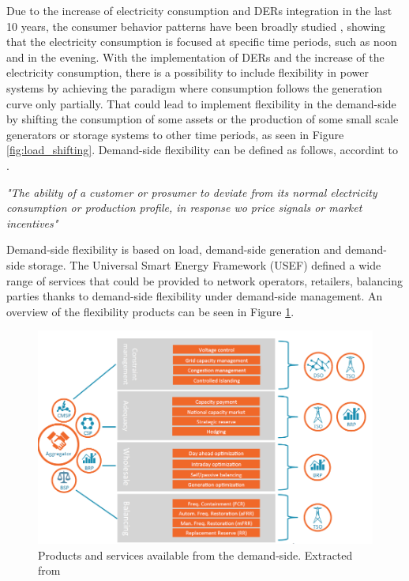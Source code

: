 Due to the increase of electricity consumption and DERs integration in the last 10 years, the consumer behavior patterns have been broadly studied \cite{ZHOU201773,TORRITI2014265}, showing that the electricity consumption is focused at specific time periods, such as noon and in the evening. With the implementation of DERs and the increase of the electricity consumption, there is a possibility to include flexibility in power systems by achieving the paradigm where consumption follows the generation curve only partially. That could lead to implement flexibility in the demand-side by shifting the consumption of some assets or the production of some small scale generators or storage systems to other time periods, as seen in Figure \ref{fig:load_shifting}. Demand-side flexibility can be defined as follows, accordint to \cite{EuropeanSmartGridsTaskForceExpertGroup32019}.  

\begin{tcolorbox}
\textit{"The ability of a customer or prosumer to deviate from its normal electricity consumption or production profile, in response wo price signals or market incentives"} 
\end{tcolorbox}

Demand-side flexibility is based on load, demand-side generation and demand-side storage. The Universal Smart Energy Framework (USEF) defined a wide range of services that could be provided to network operators, retailers, balancing parties thanks to demand-side flexibility under demand-side management. An overview of the flexibility products can be seen in Figure \ref{fig:DSF}. 

\begin{figure}[h]
	\centering 
	\includegraphics[width=1\columnwidth ]{ChapterIntro/Figures/USEF_DSF.png}
		\caption{Products and services available from the demand-side. Extracted from \cite{USEFFoundation2015a}}  
		\label{fig:DSF}
\end{figure}


